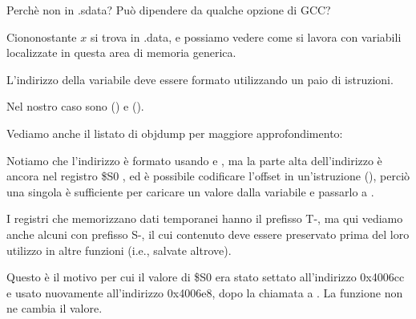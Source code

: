 Perchè non in .sdata? Può dipendere da qualche opzione di GCC?

Ciononostante $x$ si trova in .data, e possiamo vedere come si lavora con variabili localizzate in questa area di memoria generica.


L'indirizzo della variabile deve essere formato utilizzando un paio di istruzioni.

Nel nostro caso sono  () e  ().

Vediamo anche il listato di objdump per maggiore approfondimento:




Notiamo che l'indirizzo è formato usando  e , ma la parte alta dell'indirizzo è ancora nel registro
\$S0 , ed è possibile codificare l'offset in un'istruzione  (), perciò una singola  è sufficiente 
per caricare un valore dalla variabile e passarlo a \printf.

I registri che memorizzano dati temporanei hanno il prefisso T-, ma qui vediamo anche alcuni con prefisso S-, il cui contenuto deve essere preservato prima del loro
utilizzo in altre funzioni (i.e., salvate altrove).


Questo è il motivo per cui il valore di \$S0 era stato settato all'indirizzo 0x4006cc e usato nuovamente all'indirizzo 0x4006e8, dopo la chiamata a \scanf. 
La funzione \scanf non ne cambia il valore.

